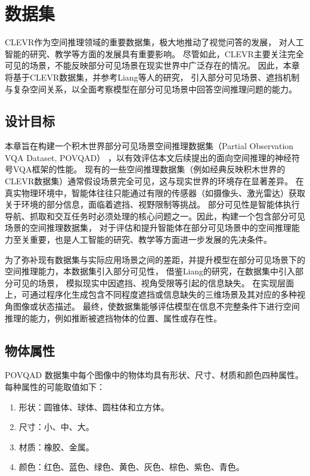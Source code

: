 \chapter{数据集}\label{dataset}
CLEVR作为空间推理领域的重要数据集，极大地推动了视觉问答的发展，
对人工智能的研究、教学等方面的发展具有重要影响。
尽管如此，CLEVR主要关注完全可见的场景，不能反映部分可见场景在现实世界中广泛存在的情况。
因此，本章将基于CLEVR数据集，并参考Liang\cite{liang2022visualabductivereasoning}等人的研究，
引入部分可见场景、遮挡机制与复杂空间关系，以全面考察模型在部分可见场景中回答空间推理问题的能力。

\section{设计目标}
本章旨在构建一个积木世界部分可见场景空间推理数据集（Partial Observation VQA Data\-set, POVQAD）
，以有效评估本文后续提出的面向空间推理的神经符号VQA框架的性能。
现有的一些空间推理数据集（例如经典反映积木世界的CLEVR数据集）通常假设场景完全可见，这与现实世界的环境存在显著差异。
在真实物理环境中，智能体往往只能通过有限的传感器（如摄像头、激光雷达）获取关于环境的部分信息，面临着遮挡、视野限制等挑战。
部分可见性是智能体执行导航、抓取和交互任务时必须处理的核心问题之一。因此，构建一个包含部分可见场景的空间推理数据集，
对于评估和提升智能体在部分可见场景中的空间推理能力至关重要，也是人工智能的研究、教学等方面进一步发展的先决条件。

为了弥补现有数据集与实际应用场景之间的差距，并提升模型在部分可见场景下的空间推理能力，本数据集引入部分可见性，
借鉴Liang\cite{liang2022visualabductivereasoning}的研究，在数据集中引入部分可见的场景，
模拟现实中因遮挡、视角受限等引起的信息缺失。
在实现层面上，可通过程序化生成包含不同程度遮挡或信息缺失的三维场景及其对应的多种视角图像或状态描述。
最终，使数据集能够评估模型在信息不完整条件下进行空间推理的能力，例如推断被遮挡物体的位置、属性或存在性。

\section{物体属性}
POVQAD 数据集中每个图像中的物体均具有形状、尺寸、材质和颜色四种属性。每种属性的可能取值如下：
\begin{enumerate}[label=(\arabic*),itemsep=0pt,parsep=0pt]
    \item 形状：圆锥体、球体、圆柱体和立方体。
    \item 尺寸：小、中、大。
    \item 材质：橡胶、金属。
    \item 颜色：红色、蓝色、绿色、黄色、灰色、棕色、紫色、青色。
\end{enumerate}

